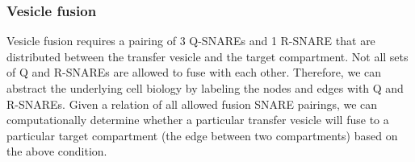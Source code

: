 \subsubsection{Vesicle fusion}
%
% 
%
%  
%
%
Vesicle fusion requires a pairing of 3 Q-SNAREs and 1 R-SNARE that are distributed between the transfer vesicle and the target compartment. 
%
%
Not all sets of Q and R-SNAREs are allowed to fuse with each other.
%
%
Therefore, we can abstract the underlying cell biology by labeling the nodes and edges with Q and R-SNAREs. 
%
%
Given a relation of all allowed fusion SNARE pairings, we can computationally determine whether a particular transfer vesicle will fuse to a particular target compartment (the edge between two compartments) based on the above condition.  

